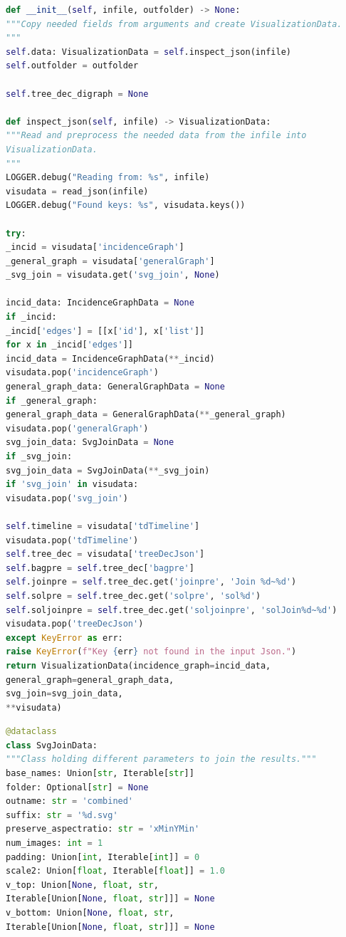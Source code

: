 \documentclass[a4paper, 12pt, bibliography=totoc]{scrartcl}
\begin{document}
\begin{lstlisting}[language={Python}, caption={Initializing a Visualization object}, label={lst:visuinit}]
def __init__(self, infile, outfolder) -> None:
"""Copy needed fields from arguments and create VisualizationData.
"""
self.data: VisualizationData = self.inspect_json(infile)
self.outfolder = outfolder

self.tree_dec_digraph = None

def inspect_json(self, infile) -> VisualizationData:
"""Read and preprocess the needed data from the infile into 
VisualizationData.
"""
LOGGER.debug("Reading from: %s", infile)
visudata = read_json(infile)
LOGGER.debug("Found keys: %s", visudata.keys())

try:
_incid = visudata['incidenceGraph']
_general_graph = visudata['generalGraph']
_svg_join = visudata.get('svg_join', None)

incid_data: IncidenceGraphData = None
if _incid:
_incid['edges'] = [[x['id'], x['list']]
for x in _incid['edges']]
incid_data = IncidenceGraphData(**_incid)
visudata.pop('incidenceGraph')
general_graph_data: GeneralGraphData = None
if _general_graph:
general_graph_data = GeneralGraphData(**_general_graph)
visudata.pop('generalGraph')
svg_join_data: SvgJoinData = None
if _svg_join:
svg_join_data = SvgJoinData(**_svg_join)
if 'svg_join' in visudata:
visudata.pop('svg_join')

self.timeline = visudata['tdTimeline']
visudata.pop('tdTimeline')
self.tree_dec = visudata['treeDecJson']
self.bagpre = self.tree_dec['bagpre']
self.joinpre = self.tree_dec.get('joinpre', 'Join %d~%d')
self.solpre = self.tree_dec.get('solpre', 'sol%d')
self.soljoinpre = self.tree_dec.get('soljoinpre', 'solJoin%d~%d')
visudata.pop('treeDecJson')
except KeyError as err:
raise KeyError(f"Key {err} not found in the input Json.")
return VisualizationData(incidence_graph=incid_data,
general_graph=general_graph_data,
svg_join=svg_join_data,
**visudata)

\end{lstlisting}

\begin{lstlisting}[language={Python}, caption={SvgJoinData}, label={lst:svgjoindataclass}]
@dataclass
class SvgJoinData:
"""Class holding different parameters to join the results."""
base_names: Union[str, Iterable[str]]
folder: Optional[str] = None
outname: str = 'combined'
suffix: str = '%d.svg'
preserve_aspectratio: str = 'xMinYMin'
num_images: int = 1
padding: Union[int, Iterable[int]] = 0
scale2: Union[float, Iterable[float]] = 1.0
v_top: Union[None, float, str, 
Iterable[Union[None, float, str]]] = None
v_bottom: Union[None, float, str, 
Iterable[Union[None, float, str]]] = None	
\end{lstlisting}
\end{document}
